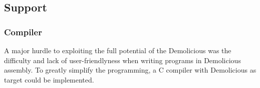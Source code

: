 \documentclass[../main/report.tex]{subfiles}
\begin{document}
\subsection{Support}
\subsubsection*{Compiler}
A major hurdle to exploiting the full potential of the Demolicious was the difficulty and lack of user-friendlyness when writing programs in Demolicious assembly.
To greatly simplify the programming, a C compiler with Demolicious as target could be implemented.
\end{document}
